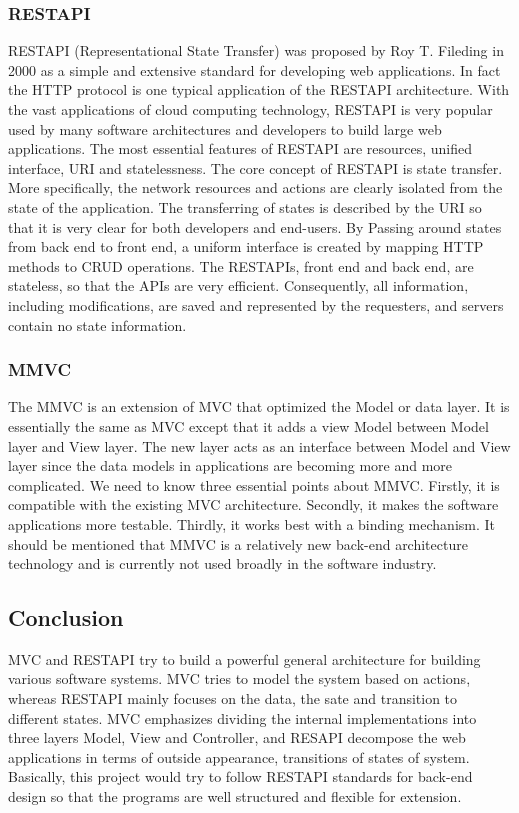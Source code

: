\documentclass[letterpaper,10pt]{article}
\begin{document}
		\subsubsection{RESTAPI}
    RESTAPI (Representational State Transfer) was proposed by Roy T. Fileding in 2000 as a simple and extensive standard for developing web applications. In fact the HTTP protocol is one typical application of the RESTAPI architecture. With the vast applications of cloud computing technology, RESTAPI is very popular used by many software architectures and developers to build large web applications. The most essential features of RESTAPI are resources, unified interface, URI and statelessness.
	The core concept of RESTAPI is state transfer. More specifically, the network resources and actions are clearly isolated from the state of the application. The transferring of states is described by the URI so that it is very clear for both developers and end-users. By Passing around states from back end to front end, a uniform interface is created by mapping HTTP methods to CRUD operations. The RESTAPIs, front end and back end, are stateless, so that the APIs are very efficient. Consequently, all information, including modifications, are saved and represented by the requesters, and servers contain no state information.

		\subsubsection{MMVC}
    The MMVC is an extension of MVC that optimized the Model or data layer. It is essentially the same as MVC except that it adds a view Model between Model layer and View layer. The new layer acts as an interface between Model and View layer since the data models in applications are becoming more and more complicated. We need to know three essential points about MMVC. Firstly, it is compatible with the existing MVC architecture. Secondly, it makes the software applications more testable. Thirdly, it works best with a binding mechanism. It should be mentioned that MMVC is a relatively new back-end architecture technology and is currently not used broadly in the software industry.


	\subsection{Conclusion}
  		MVC and RESTAPI try to build a powerful general architecture for building various software systems. MVC tries to model the system based on actions, whereas RESTAPI mainly focuses on the data, the sate and transition to different states. MVC emphasizes dividing the internal implementations into three layers Model, View and Controller, and RESAPI decompose the web applications in terms of outside appearance, transitions of states of system. Basically, this project would try to follow RESTAPI standards for back-end design so that the programs are well structured and flexible for extension.
\end{document}
